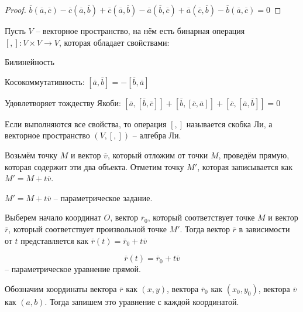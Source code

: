 	\begin{proof}
		$\overline{b}(\overline{a},\overline{c}) - \overline{c}(\overline{a}, \overline{b}) + \overline{c}(\overline{a}, \overline{b}) - \overline{a}(\overline{b}, \overline{c}) + \overline{a}(\overline{c}, \overline{b}) - \overline{b}(\overline{a}, \overline{c}) = 0$
	\end{proof}

	Пусть $V$ -- векторное пространство, на нём есть бинарная операция $[,]: V \times V \to V$, которая обладает свойствами:
	\begin{MyList}
		\item Билинейность
		\item Косокоммутативность: $[\overline{a}, \overline{b}] = -[\overline{b}, \overline{a}]$
		\item Удовлетворяет тождеству Якоби: $[\overline{a}, [\overline{b}, \overline{c}]] + [\overline{b}, [\overline{c}, \overline{a}]] + [\overline{c}, [\overline{a}, \overline{b}]] = 0$
	\end{MyList}
	
	\begin{Def}
		Если выполняются все свойства, то операция $[,]$ называется скобка Ли, а векторное пространство $(V, [,])$ -- алгебра Ли.
	\end{Def}


	Возьмём точку $M$ и вектор $\overline{v}$, который отложим от точки $M$, проведём прямую, которая содержит эти два объекта. Отметим точку $M'$, которая записывается как $M' = M + t \overline{v}$.  

	\begin{Def}
		$M' = M + t \overline{v}$ -- параметрическое задание. 
	\end{Def}

	Выберем начало координат $O$, вектор $\overline{r}_0$, который соответствует точке $M$ и вектор $\overline{r}$, который соответствует произвольной точке $M'$. Тогда вектор $\overline{r}$ в зависимости от $t$ представляется как $\overline{r}(t) = \overline{r}_0 + t \overline{v}$
	
	\begin{Def}
		$$\overline{r}(t) = \overline{r}_0 + t \overline{v}$$ -- параметрическое уравнение прямой.
	\end{Def}

	Обозначим координаты вектора $\overline{r}$ как $(x, y)$, вектора $\overline{r}_0$ как $(x_0, y_0)$, вектора $\overline{v}$ как $(a, b)$. Тогда запишем это уравнение с каждой координатой.

